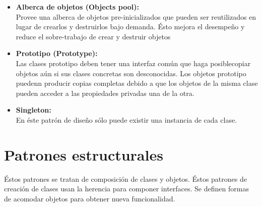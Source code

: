 \documentclass[12pt,article,oneside]{memoir}
\begin{document}
\begin{itemize}
			\item \textbf{Alberca de objetos (Objects pool):}\\
			Provee una alberca de objetos pre-inicializados que pueden ser reutilizados en lugar de crearlos y destruirlos 
			bajo demanda. \'Esto mejora el desempe\~no y reduce el sobre-trabajo de crear y destruir objetos
			
			\item \textbf{Prototipo (Prototype):}\\
			Las clases prototipo deben tener una interfaz com\'un que haga posiblecopiar objetos a\'un si sus clases concretas 
			son desconocidas. Los objetos prototipo puedenn producir copias completas debido a que los objetos de la misma 
			clase pueden acceder a las propiedades privadas una de la otra.
			
			\item \textbf{Singleton:}\\
			En \'este patr\'on de dise\~no s\'olo puede existir una instancia de cada clase.
			\newpage
			
		\end{itemize}
		\newpage
	
		\section{Patrones estructurales}
		\'Estos patrones se tratan de composici\'on de clases y objetos. \'Estos patrones de creaci\'on de clases usan la 
		herencia para componer interfaces. Se definen formas de acomodar objetos para obtener nueva funcionalidad.\\
		
\end{document}
